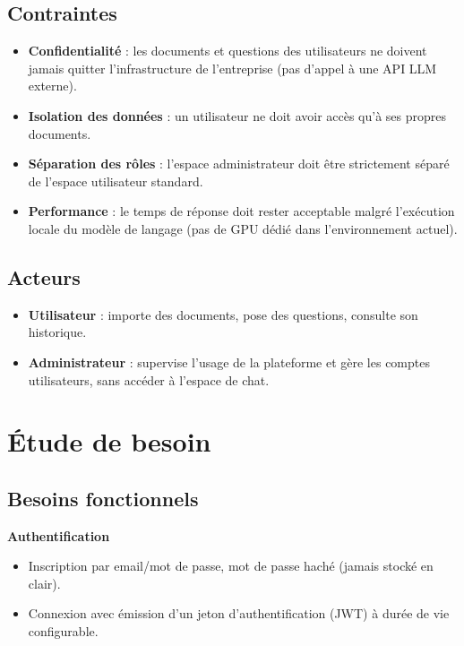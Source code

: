 \documentclass[12pt,a4paper]{article}
\begin{document}
\subsection{Contraintes}
\begin{itemize}
  \item \textbf{Confidentialité} : les documents et questions des utilisateurs ne doivent jamais quitter l'infrastructure de l'entreprise (pas d'appel à une API LLM externe).
  \item \textbf{Isolation des données} : un utilisateur ne doit avoir accès qu'à ses propres documents.
  \item \textbf{Séparation des rôles} : l'espace administrateur doit être strictement séparé de l'espace utilisateur standard.
  \item \textbf{Performance} : le temps de réponse doit rester acceptable malgré l'exécution locale du modèle de langage (pas de GPU dédié dans l'environnement actuel).
\end{itemize}

\subsection{Acteurs}
\begin{itemize}
  \item \textbf{Utilisateur} : importe des documents, pose des questions, consulte son historique.
  \item \textbf{Administrateur} : supervise l'usage de la plateforme et gère les comptes utilisateurs, sans accéder à l'espace de chat.
\end{itemize}

\section{Étude de besoin}

\subsection{Besoins fonctionnels}

\textbf{Authentification}
\begin{itemize}
  \item Inscription par email/mot de passe, mot de passe haché (jamais stocké en clair).
  \item Connexion avec émission d'un jeton d'authentification (JWT) à durée de vie configurable.
\end{itemize}
\end{document}
